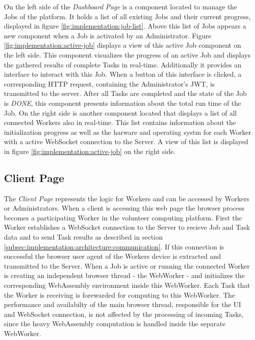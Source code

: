 On the left side of the \emph{Dashboard Page} is a component located to manage the Jobs of the platform. It holds a list of all existing Jobs and their current progress, displayed in figure \ref{fig:implementation:job-list}. Above this list of Jobs appears a new component when a Job is activated by an Administrator. Figure \ref{fig:implementation:active-job} displays a view of this active Job component on the left side. This component visualizes the progress of an active Job and displays the gathered results of complete Tasks in real-time. Additionally it provides an interface to interact with this Job. When a button of this interface is clicked, a corresponding \acs{HTTP} request, containing the Administrator's \ac{JWT}, is transmitted to the server. After all Tasks are completed and the state of the Job is \emph{DONE}, this component presents information about the total run time of the Job. On the right side is another component located that displays a list of all connected Workers also in real-time. This list contains information about the initialization progress as well as the harware and operating systm for each Worker with a active WebSocket connection to the Server. A view of this list is displayed in figure \ref{fig:implementation:active-job} on the right side.

\subsection{Client Page}
\label{subsec:implementation:client-page}
The \emph{Client Page} represents the logic for Workers and can be accessed by Workers or Administrators. When a client is accessing this web page the browser process becomes a participating Worker in the volunteer computing platform. First the Worker establishes a WebSocket connection to the Server to recieve Job and Task data and to send Task results as described in section \ref{subsec:implementation:architecture:communication}. If this connection is successful the browser user agent of the Workers device is extracted and transmitted to the Server. When a Job is active or running the connected Worker is creating an independent browser thread - the WebWorker - and initializes the corresponding WebAssembly environment inside this WebWorker. Each Task that the Worker is receiving is forewarded for computing to this WebWorker. The performance and availabilty of the main browser thread, responsible for the \ac{UI} and WebSocket connection, is not affected by the processing of incoming Tasks, since the heavy WebAssembly computation is handled inside the separate WebWorker.

